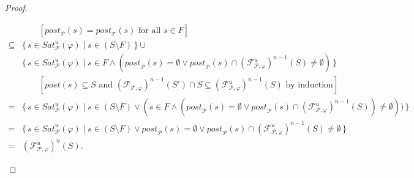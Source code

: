 \documentclass[12pt]{article}
\theoremstyle{definition}
\newcommand{\comment}[1]{\hspace{2em}[\mbox{#1}]}
\begin{document}
\begin{proof}
\begin{itemize}
\begin{align*}
& \comment{$\mathit{post}_{\mathcal{P}}(s) = \mathit{post}_{\mathcal{T}}(s)$ for all $s \in F$}\\
\subseteq & \{\, s \in \mathit{Sat}^u_{\mathcal{P}}(\varphi) \mid s \in (S \setminus F) \,\} \cup\\
& \{\, s \in \mathit{Sat}^u_{\mathcal{P}}(\varphi) \mid s \in F \wedge (\mathit{post}_{\mathcal{P}}(s) = \emptyset \vee \mathit{post}_{\mathcal{P}}(s) \cap (\mathcal{F}_{\mathcal{P}, \varphi}^u)^{n-1}(S) \not= \emptyset) \,\}\\
& \comment{$\mathit{post}(s) \subseteq S$ and $(\mathcal{F}_{\mathcal{T}, \varphi})^{n-1}(S') \cap S \subseteq (\mathcal{F}_{\mathcal{P}, \varphi}^u)^{n-1}(S)$ by induction}\\
= & \{\, s \in \mathit{Sat}^u_{\mathcal{P}}(\varphi) \mid s \in (S \setminus F) \vee (s \in F \wedge (\mathit{post}_{\mathcal{P}}(s) = \emptyset \vee \mathit{post}_{\mathcal{P}}(s) \cap (\mathcal{F}_{\mathcal{P}, \varphi}^{u})^{n-1}(S)) \not= \emptyset)) \,\}\\
= & \{\, s \in \mathit{Sat}^u_{\mathcal{P}}(\varphi) \mid s \in (S \setminus F) \vee \mathit{post}_{\mathcal{P}}(s) = \emptyset \vee \mathit{post}_{\mathcal{P}}(s) \cap (\mathcal{F}_{\mathcal{P}, \varphi}^{u})^{n-1}(S) \not= \emptyset \,\}\\
= & (\mathcal{F}_{\mathcal{P}, \varphi}^{u})^{n}(S).
\end{align*}


\end{itemize}
\end{proof}
\end{document}
